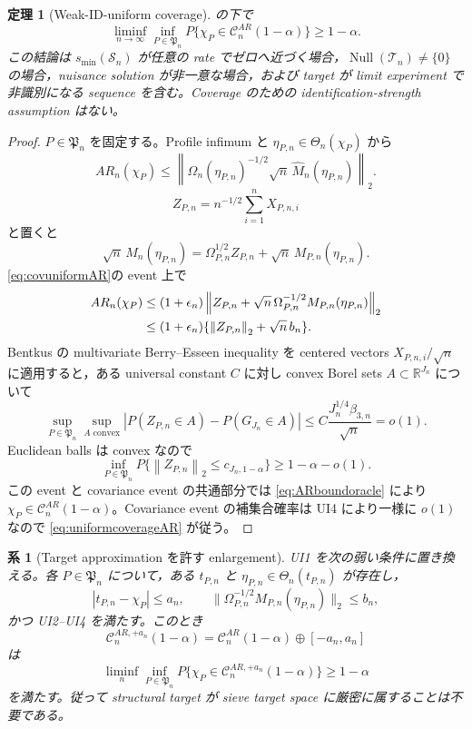 \documentclass[11pt,a4paper]{ltjsarticle}
\newtheorem{theorem}{定理}[section]
\newtheorem{corollary}{系}[section]
\theoremstyle{remark}
\newcommand{\R}{\mathbb R}
\newcommand{\wh}{\widehat}
\newcommand{\norm}[1]{\left\lVert#1\right\rVert}
\newcommand{\cC}{\mathcal C}
\newcommand{\Top}{\mathscr T}
\newcommand{\Sop}{\mathscr S}
\newcommand{\Null}{\operatorname{Null}}
\begin{document}
\begin{theorem}[Weak-ID-uniform coverage]\label{thm:uniformAR}
の下で
\begin{equation}
\liminf_{n\to\infty}
\inf_{P\in\mathfrak P_n}
P\{\chi_P\in\cC_n^{AR}(1-\alpha)\}
\ge1-\alpha.
\label{eq:uniformcoverageAR}
\end{equation}
この結論は $s_{\min}(\Sop_n)$ が任意の rate でゼロへ近づく場合，$\Null(\Top_n)\neq\{0\}$ の場合，nuisance solution が非一意な場合，および target が limit experiment で非識別になる sequence を含む。Coverage のための identification-strength assumption はない。
\end{theorem}

\begin{proof}
$P\in\mathfrak P_n$ を固定する。Profile infimum と $\eta_{P,n}\in\Theta_n(\chi_P)$ から
\begin{equation}
AR_n(\chi_P)
\le
\left\|
\wh\Omega_n(\eta_{P,n})^{-1/2}
\sqrt n\,\wh M_n(\eta_{P,n})
\right\|_2.
\label{eq:ARoracleupper}
\end{equation}
\[
Z_{P,n}=n^{-1/2}\sum_{i=1}^nX_{P,n,i}
\]
と置くと
\[
\sqrt n\,\wh M_n(\eta_{P,n})
=\Omega_{P,n}^{1/2}Z_{P,n}
+\sqrt n\,M_{P,n}(\eta_{P,n}).
\]
\eqref{eq:covuniformAR}の event 上で
\begin{align}
AR_n(\chi_P)
&\le(1+\epsilon_n)
\left\|
Z_{P,n}
+\sqrt n\,\Omega_{P,n}^{-1/2}M_{P,n}(\eta_{P,n})
\right\|_2\notag\\
&\le(1+\epsilon_n)
\{\norm{Z_{P,n}}_2+\sqrt n\,b_n\}.
\label{eq:ARboundoracle}
\end{align}
Bentkus の multivariate Berry--Esseen inequality を centered vectors $X_{P,n,i}/\sqrt n$ に適用すると，ある universal constant $C$ に対し convex Borel sets $A\subset\R^{J_n}$ について
\begin{equation}
\sup_{P\in\mathfrak P_n}
\sup_{A\text{ convex}}
\left|
P(Z_{P,n}\in A)-P(G_{J_n}\in A)
\right|
\le C\frac{J_n^{1/4}\beta_{3,n}}{\sqrt n}=o(1).
\label{eq:Bentkusapply}
\end{equation}
Euclidean balls は convex なので
\[
\inf_{P\in\mathfrak P_n}
P\{\norm{Z_{P,n}}_2\le c_{J_n,1-\alpha}\}
\ge1-\alpha-o(1).
\]
この event と covariance event の共通部分では \eqref{eq:ARboundoracle} により $\chi_P\in\cC_n^{AR}(1-\alpha)$。Covariance event の補集合確率は UI4 により一様に $o(1)$ なので \eqref{eq:uniformcoverageAR} が従う。
\end{proof}

\begin{corollary}[Target approximation を許す enlargement]\label{cor:ARtargetapprox}
UI1 を次の弱い条件に置き換える。各 $P\in\mathfrak P_n$ について，ある $t_{P,n}$ と
$\eta_{P,n}\in\Theta_n(t_{P,n})$ が存在し，
\[
|t_{P,n}-\chi_P|\le a_n,
\qquad
\|\Omega_{P,n}^{-1/2}M_{P,n}(\eta_{P,n})\|_2\le b_n,
\]
かつ UI2--UI4 を満たす。このとき
\[
\cC_n^{AR,+a_n}(1-\alpha)
=\cC_n^{AR}(1-\alpha)\oplus[-a_n,a_n]
\]
は
\[
\liminf_n\inf_{P\in\mathfrak P_n}
P\{\chi_P\in\cC_n^{AR,+a_n}(1-\alpha)\}\ge1-\alpha
\]
を満たす。従って structural target が sieve target space に厳密に属することは不要である。
\end{corollary}
\end{document}

